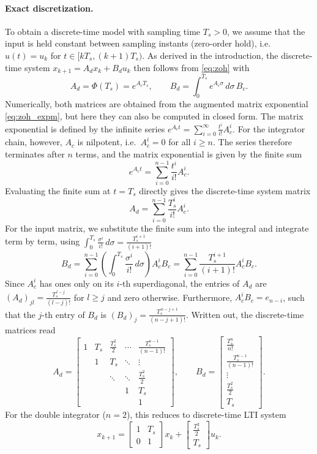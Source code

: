 \paragraph{Exact discretization.}
To obtain a discrete-time model with sampling time $T_s > 0$, we assume that the input is held constant between sampling instants (zero-order hold), i.e.\ $u(t) = u_k$ for $t \in [k T_s, (k+1) T_s)$.
As derived in the introduction, the discrete-time system $x_{k+1} = A_d x_k + B_d u_k$ then follows from \eqref{eq:zoh} with
\[
A_d = \Phi(T_s) = e^{A_c T_s},
\qquad
B_d = \int_0^{T_s} e^{A_c \sigma} \, d\sigma \, B_c.
\]
Numerically, both matrices are obtained from the augmented matrix exponential \eqref{eq:zoh_expm}, but here they can also be computed in closed form.
The matrix exponential is defined by the infinite series $e^{A_c t} = \sum_{i=0}^{\infty} \frac{t^i}{i!} A_c^i$.
For the integrator chain, however, $A_c$ is nilpotent, i.e.\ $A_c^i = 0$ for all $i \geq n$.
The series therefore terminates after $n$ terms, and the matrix exponential is given by the finite sum
\[
e^{A_c t} = \sum_{i=0}^{n-1} \frac{t^i}{i!} A_c^i.
\]
Evaluating the finite sum at $t = T_s$ directly gives the discrete-time system matrix
\begin{equation} \label{eq:integrator_A}
A_d = \sum_{i=0}^{n-1} \frac{T_s^i}{i!} A_c^i.
\end{equation}
For the input matrix, we substitute the finite sum into the integral and integrate term by term, using $\int_0^{T_s} \frac{\sigma^i}{i!} \, d\sigma = \frac{T_s^{i+1}}{(i+1)!}$
\begin{equation} \label{eq:integrator_B}
B_d = \sum_{i=0}^{n-1} \left( \int_0^{T_s} \frac{\sigma^i}{i!} \, d\sigma \right) A_c^i B_c = \sum_{i=0}^{n-1} \frac{T_s^{i+1}}{(i+1)!} A_c^i B_c.
\end{equation}
Since $A_c^i$ has ones only on its $i$-th superdiagonal, the entries of $A_d$ are $(A_d)_{jl} = \frac{T_s^{\,l-j}}{(l-j)!}$ for $l \geq j$ and zero otherwise.
Furthermore, $A_c^i B_c = e_{n-i}$, such that the $j$-th entry of $B_d$ is $(B_d)_j = \frac{T_s^{\,n-j+1}}{(n-j+1)!}$.
Written out, the discrete-time matrices read
\[
A_d = \begin{bmatrix}
    1 & T_s & \frac{T_s^2}{2} & \cdots & \frac{T_s^{n-1}}{(n-1)!} \\
      & 1 & T_s & \ddots & \vdots \\
      & & \ddots & \ddots & \frac{T_s^2}{2} \\
      & & & 1 & T_s \\
      & & & & 1
\end{bmatrix},
\qquad
B_d = \begin{bmatrix}
    \frac{T_s^n}{n!} \\
    \frac{T_s^{n-1}}{(n-1)!} \\
    \vdots \\
    \frac{T_s^2}{2} \\
    T_s
\end{bmatrix}.
\]
For the double integrator ($n = 2$), this reduces to discrete-time LTI system
\[
x_{k+1} = \begin{bmatrix} 1 & T_s \\ 0 & 1 \end{bmatrix} x_k + \begin{bmatrix} \frac{T_s^2}{2} \\ T_s \end{bmatrix} u_k.
\]

\newpage
